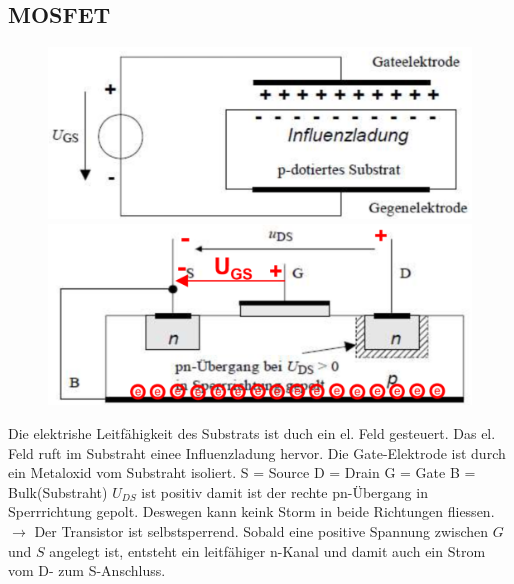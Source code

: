 \subsection{MOSFET}
\begin{figure}
    \vspace{-1cm}
    \includegraphics[width=\linewidth]{images/mosfetprinz}
    \newline
    \includegraphics[width=\linewidth]{images/mosfetprak}
\end{figure}
Die elektrishe Leitfähigkeit des Substrats ist duch ein el. Feld gesteuert. Das el. Feld ruft im Substraht einee Influenzladung hervor.\newline
Die Gate-Elektrode ist durch ein Metaloxid vom Substraht isoliert.\newline\newline
S = Source \quad D = Drain \newline
G = Gate \quad B = Bulk(Substraht)\newline\newline
$ U_{DS} $ ist positiv damit ist der rechte pn-Übergang in Sperrrichtung gepolt. Deswegen kann keink Storm in beide Richtungen fliessen.\newline
$ \rightarrow $ Der Transistor ist selbstsperrend.\newline
\danger Sobald eine positive Spannung zwischen $ G $ und $ S $ angelegt ist, entsteht ein leitfähiger n-Kanal und damit auch ein Strom vom D- zum S-Anschluss.

